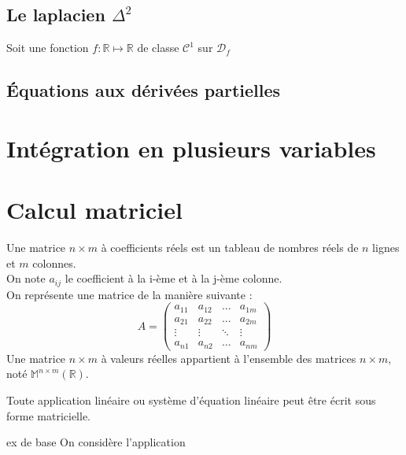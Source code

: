 \section{Le laplacien $\Delta^2$}
\begin{defi}
Soit une fonction $f:\mathbb{R}\mapsto\mathbb{R}$ de classe $\mathscr{C}^1$ sur $\mathscr{D}_f$
\end{defi}
\section{Équations aux dérivées partielles}
\chapter{Intégration en plusieurs variables}
\chapter{Calcul matriciel}
\begin{defi}
Une matrice $n\times m$ à  coefficients réels est un tableau de nombres réels de $n$ lignes et $m$ colonnes.\\
On note $a_{ij}$ le coefficient à la i-ème  et à la j-ème colonne.\\
On représente une matrice de la manière suivante :
$$A = \begin{pmatrix}a_{11} & a_{12} & \hdots & a_{1m}\\a_{21} & a_{22} & \hdots & a_{2m}\\ \vdots & \vdots & \ddots & \vdots\\ a_{n1} & a_{n2} & \hdots & a_{nm} \end{pmatrix}$$
\newline
Une matrice $n\times m$ à valeurs réelles appartient à l'ensemble des matrices $n\times m$, noté $\mathbb{M}^{n\times m}(\mathbb{R})$.
\end{defi}
Toute application linéaire ou système d'équation linéaire peut être écrit sous forme matricielle.
\begin{ex}
ex de base
On considère l'application
\end{ex}
